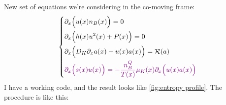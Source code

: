 \documentclass[11pt]{article}
\newcommand{\AHcom}[1]{\textsf{\color{cyan}{\textsuperscript{AH}#1}}}
\newcommand{\JS}[1]{{\color{violet}#1}}
\begin{document}
\iffalse
New set of equations we're considering in the co-moving frame:
\begin{equation}
\left\{
\begin{aligned}
& \partial_x\Big(u(x) n_B(x)\Big) = 0 \\
& \partial_x\Big( h(x)u^2(x) + P(x)\Big) = 0\\
& \partial_x\Big( D_K\partial_x a(x) - u(x)a(x)\Big) = \mathcal{R}(a)\\
& \JS{\partial_x\Big(s(x)u(x)\Big) = -\frac{n_B^Q}{T(x)}\mu_K(x)\partial_x\Big(u(x) a(x)\Big)}
\end{aligned}
\right. \label{old-steady-state}
\end{equation}
I have a working code, and the result looks like \ref{fig:entropy profile}. The procedure is like this:
\end{document}
